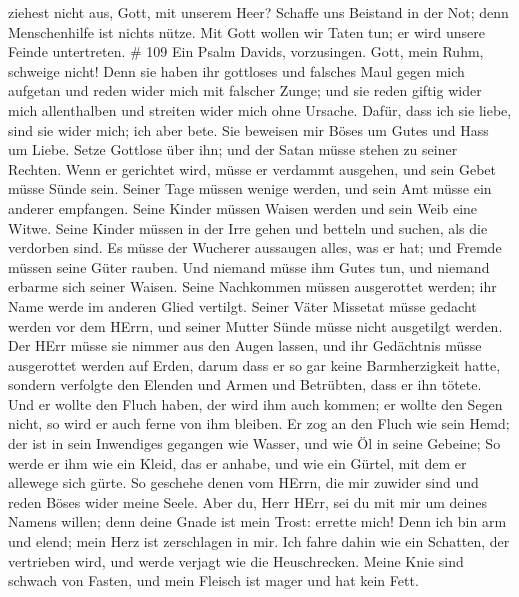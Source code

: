 ziehest nicht aus, Gott, mit unserem Heer?  Schaffe uns
Beistand in der Not; denn Menschenhilfe ist nichts nütze. 
Mit Gott wollen wir Taten tun; er wird unsere Feinde untertreten. \# 109
 Ein Psalm Davids, vorzusingen. Gott, mein Ruhm, schweige
nicht!  Denn sie haben ihr gottloses und falsches Maul gegen
mich aufgetan und reden wider mich mit falscher Zunge;  und
sie reden giftig wider mich allenthalben und streiten wider mich ohne
Ursache.  Dafür, dass ich sie liebe, sind sie wider mich;
ich aber bete.  Sie beweisen mir Böses um Gutes und Hass um
Liebe.  Setze Gottlose über ihn; und der Satan müsse stehen
zu seiner Rechten.  Wenn er gerichtet wird, müsse er
verdammt ausgehen, und sein Gebet müsse Sünde sein.  Seiner
Tage müssen wenige werden, und sein Amt müsse ein anderer empfangen.
 Seine Kinder müssen Waisen werden und sein Weib eine Witwe.
 Seine Kinder müssen in der Irre gehen und betteln und
suchen, als die verdorben sind.  Es müsse der Wucherer
aussaugen alles, was er hat; und Fremde müssen seine Güter rauben.
 Und niemand müsse ihm Gutes tun, und niemand erbarme sich
seiner Waisen.  Seine Nachkommen müssen ausgerottet werden;
ihr Name werde im anderen Glied vertilgt.  Seiner Väter
Missetat müsse gedacht werden vor dem HErrn, und seiner Mutter Sünde
müsse nicht ausgetilgt werden.  Der HErr müsse sie nimmer
aus den Augen lassen, und ihr Gedächtnis müsse ausgerottet werden auf
Erden,  darum dass er so gar keine Barmherzigkeit hatte,
sondern verfolgte den Elenden und Armen und Betrübten, dass er ihn
tötete.  Und er wollte den Fluch haben, der wird ihm auch
kommen; er wollte den Segen nicht, so wird er auch ferne von ihm
bleiben.  Er zog an den Fluch wie sein Hemd; der ist in
sein Inwendiges gegangen wie Wasser, und wie Öl in seine Gebeine;
 So werde er ihm wie ein Kleid, das er anhabe, und wie ein
Gürtel, mit dem er allewege sich gürte.  So geschehe denen
vom HErrn, die mir zuwider sind und reden Böses wider meine Seele.
 Aber du, Herr HErr, sei du mit mir um deines Namens
willen; denn deine Gnade ist mein Trost: errette mich! 
Denn ich bin arm und elend; mein Herz ist zerschlagen in mir.
 Ich fahre dahin wie ein Schatten, der vertrieben wird, und
werde verjagt wie die Heuschrecken.  Meine Knie sind
schwach von Fasten, und mein Fleisch ist mager und hat kein Fett.
